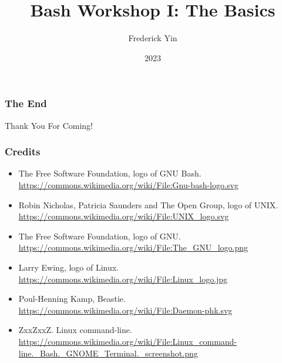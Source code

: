 \documentclass{beamer}
\title{Bash Workshop I: The Basics}
\author{Frederick Yin}
\institute{JITech}
\date{2023}
\begin{document}
\frame{\titlepage}






\begin{frame}
\frametitle{The End}
\vspace{1cm}
\centering \Huge {Thank You For Coming!}
\end{frame}

\begin{frame}
\frametitle{Credits}
\begin{itemize}
    \item The Free Software Foundation, logo of GNU Bash.
        \url{https://commons.wikimedia.org/wiki/File:Gnu-bash-logo.svg}
    \item Robin Nicholas, Patricia Saunders and The Open Group, logo of UNIX.
        \url{https://commons.wikimedia.org/wiki/File:UNIX_logo.svg}
    \item The Free Software Foundation, logo of GNU.
        \url{https://commons.wikimedia.org/wiki/File:The_GNU_logo.png}
    \item Larry Ewing, logo of Linux.
        \url{https://commons.wikimedia.org/wiki/File:Linux_logo.jpg}
    \item Poul-Henning Kamp, Beastie.
        \url{https://commons.wikimedia.org/wiki/File:Daemon-phk.svg}
    \item ZxxZxxZ. Linux command-line.
        \url{https://commons.wikimedia.org/wiki/File:Linux_command-line._Bash._GNOME_Terminal._screenshot.png}
\end{itemize}
\end{frame}
\end{document}
